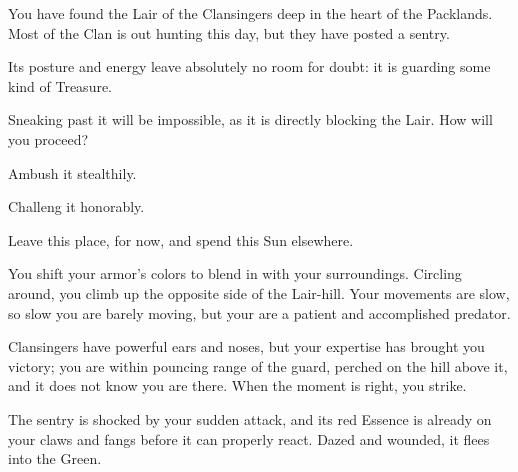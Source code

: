



You have found the Lair of the Clansingers deep in the heart of the Packlands.
Most of the Clan is out hunting this day, but they have posted a sentry.

Its posture and energy leave absolutely no room for doubt: it is guarding some
kind of Treasure.

Sneaking past it will be impossible, as it is directly blocking the Lair. How
will you proceed?

\option Ambush it stealthily.

\option Challeng it honorably. 

\option Leave this place, for now, and spend this Sun elsewhere.
	 


You shift your armor's colors to blend in with your surroundings. Circling
around, you climb up the opposite side of the Lair-hill. Your movements are
slow, so slow you are barely moving, but your are a patient and accomplished
predator.

Clansingers have powerful ears and noses, but your expertise has brought you
victory; you are within pouncing range of the guard, perched on the hill above
it, and it does not know you are there. When the moment is right, you strike.

The sentry is shocked by your sudden attack, and its red Essence is already on
your claws and fangs before it can properly react. Dazed and wounded, it flees
into the Green.

